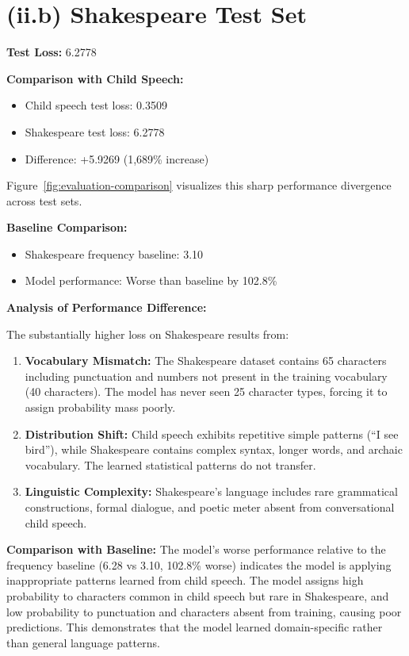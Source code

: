 \documentclass[11pt]{article}
\begin{document}
\section*{(ii.b) Shakespeare Test Set}

\textbf{Test Loss:} 6.2778

\textbf{Comparison with Child Speech:}
\begin{itemize}
    \item Child speech test loss: 0.3509
    \item Shakespeare test loss: 6.2778
    \item Difference: +5.9269 (1,689\% increase)
\end{itemize}
Figure~\ref{fig:evaluation-comparison} visualizes this sharp performance divergence across test sets.

\textbf{Baseline Comparison:}
\begin{itemize}
    \item Shakespeare frequency baseline: 3.10
    \item Model performance: Worse than baseline by 102.8\%
\end{itemize}

\textbf{Analysis of Performance Difference:}

The substantially higher loss on Shakespeare results from:

\begin{enumerate}
    \item \textbf{Vocabulary Mismatch:} The Shakespeare dataset contains 65 characters including punctuation and numbers not present in the training vocabulary (40 characters). The model has never seen 25 character types, forcing it to assign probability mass poorly.
    
    \item \textbf{Distribution Shift:} Child speech exhibits repetitive simple patterns (``I see bird''), while Shakespeare contains complex syntax, longer words, and archaic vocabulary. The learned statistical patterns do not transfer.
    
    \item \textbf{Linguistic Complexity:} Shakespeare's language includes rare grammatical constructions, formal dialogue, and poetic meter absent from conversational child speech.
\end{enumerate}

\textbf{Comparison with Baseline:} The model's worse performance relative to the frequency baseline (6.28 vs 3.10, 102.8\% worse) indicates the model is applying inappropriate patterns learned from child speech. The model assigns high probability to characters common in child speech but rare in Shakespeare, and low probability to punctuation and characters absent from training, causing poor predictions. This demonstrates that the model learned domain-specific rather than general language patterns.
\end{document}
